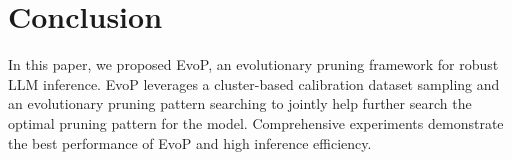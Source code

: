 \section{Conclusion}
In this paper, we proposed EvoP, an evolutionary pruning framework for robust LLM inference.
EvoP leverages a cluster-based calibration dataset sampling and an evolutionary pruning pattern searching to jointly help further search the optimal pruning pattern for the model.
Comprehensive experiments demonstrate the best performance of EvoP and high inference efficiency.
